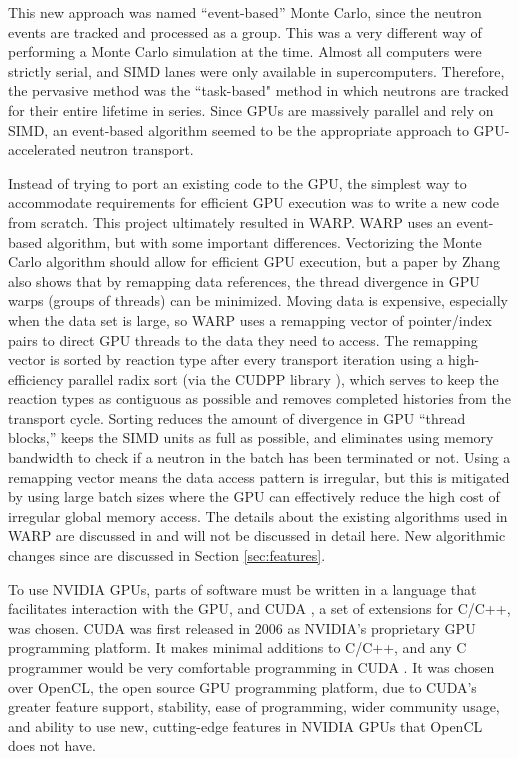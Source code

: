 \documentclass[preprint,12pt]{elsarticle}
\begin{document}
This new approach was named ``event-based'' Monte Carlo, since the neutron events are tracked and processed as a group.  This was a very different way of performing a Monte Carlo simulation at the time.  Almost all computers were strictly serial, and SIMD lanes were only available in supercomputers.  Therefore, the pervasive method was the ``task-based" method in which neutrons are tracked for their entire lifetime in series.  Since GPUs are massively parallel and rely on SIMD, an event-based algorithm seemed to be the appropriate approach to GPU-accelerated neutron transport.  

Instead of trying to port an existing code to the GPU, the simplest way to accommodate requirements for efficient GPU execution was to write a new code from scratch.  This project ultimately resulted in WARP.  WARP uses an event-based algorithm, but with some important differences.  Vectorizing the Monte Carlo algorithm should allow for efficient GPU execution, but a paper by Zhang \cite{on_the_fly_remapping} also shows that by remapping data references, the thread divergence in GPU warps (groups of threads) can be minimized. Moving data is expensive, especially when the data set is large, so WARP uses a remapping vector of pointer/index pairs to direct GPU threads to the data they need to access.  The remapping vector is sorted  by reaction type after every transport iteration using a high-efficiency parallel radix sort (via the CUDPP library \cite{CUDPP}), which serves to keep the reaction types as contiguous as possible and removes completed histories from the transport cycle.  Sorting reduces the amount of divergence in GPU ``thread blocks,'' keeps the SIMD units as full as possible, and eliminates using memory bandwidth to check if a neutron in the batch has been terminated or not.  Using a remapping vector means the data access pattern is irregular, but this is mitigated by using large batch sizes where the GPU can effectively reduce the high cost of irregular global memory access.  The details about the existing algorithms used in WARP are discussed in \cite{algorithms} and will not be discussed in detail here.  New algorithmic changes since are discussed in Section \ref{sec:features}.

To use NVIDIA GPUs, parts of software must be written in a language that facilitates interaction with the GPU, and CUDA \cite{cuda}, a set of extensions for C/C++, was chosen.  CUDA was first released in 2006 as NVIDIA's proprietary GPU programming platform.  It makes minimal additions to C/C++, and any C programmer would be very comfortable programming in CUDA \cite{cuda}.  It was chosen over OpenCL, the open source GPU programming platform, due to CUDA's greater feature support, stability, ease of programming, wider community usage, and ability to use new, cutting-edge features in NVIDIA GPUs that OpenCL does not have.
\end{document}
